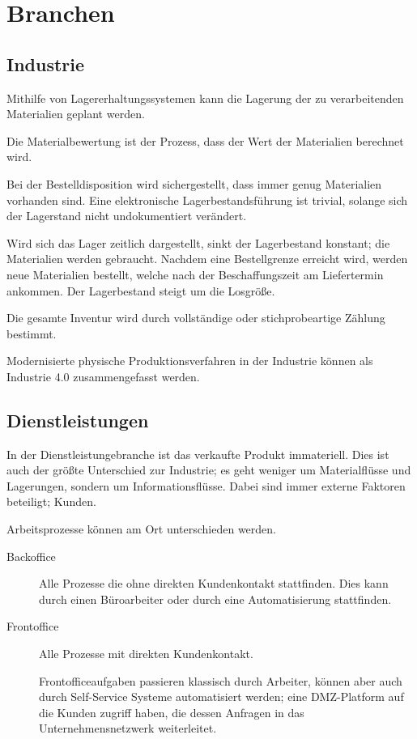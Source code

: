 \documentclass{article}
\begin{document}
\section{Branchen}
\subsection{Industrie}
Mithilfe von Lagererhaltungssystemen kann die Lagerung der zu verarbeitenden Materialien geplant werden.

Die Materialbewertung ist der Prozess, dass der Wert der Materialien berechnet wird.

Bei der Bestelldisposition wird sichergestellt, dass immer genug Materialien vorhanden sind. Eine elektronische Lagerbestandsführung ist trivial, solange sich der Lagerstand nicht undokumentiert verändert.

Wird sich das Lager zeitlich dargestellt, sinkt der Lagerbestand konstant; die Materialien werden gebraucht. Nachdem eine Bestellgrenze erreicht wird, werden neue Materialien bestellt, welche nach der Beschaffungszeit am Liefertermin ankommen. Der Lagerbestand steigt um die Losgröße.

Die gesamte Inventur wird durch vollständige oder stichprobeartige Zählung bestimmt.

Modernisierte physische Produktionsverfahren in der Industrie können als Industrie 4.0 zusammengefasst werden.

\subsection{Dienstleistungen}
In der Dienstleistungebranche ist das verkaufte Produkt immateriell. Dies ist auch der größte Unterschied zur Industrie; es geht weniger um Materialflüsse und Lagerungen, sondern um Informationsflüsse. Dabei sind immer externe Faktoren beteiligt; \idr Kunden.

Arbeitsprozesse können am Ort unterschieden werden.
\begin{description}
 \item[Backoffice] Alle Prozesse die ohne direkten Kundenkontakt stattfinden. Dies kann durch einen Büroarbeiter oder durch eine Automatisierung stattfinden.
 \item[Frontoffice] Alle Prozesse mit direkten Kundenkontakt.

Frontofficeaufgaben passieren klassisch durch Arbeiter, können aber auch durch Self-Service Systeme automatisiert werden; eine DMZ-Platform auf die Kunden zugriff haben, die dessen Anfragen in das Unternehmensnetzwerk weiterleitet.
\end{description}
\end{document}
